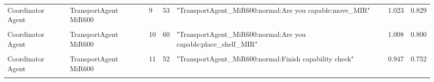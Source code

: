 \begin{table}[b]
\begin{tabular}{m{} m{} m{} m{} m{} m{} m{}}
    Coordinator Agent & TransportAgent MiR600 & 9  & 53  & "TransportAgent\_MiR600:normal:Are you capable:move\_MIR"                                                                                                                                                                                                                                                                                                                                                                                                                                                                                                                                                                                                                                & 1.023 & 0.829 \\ 
    & & & & & &\\
    Coordinator Agent & TransportAgent MiR600 & 10 & 60  & "TransportAgent\_MiR600:normal:Are you capable:place\_shelf\_MIR"                                                                                                                                                                                                                                                                                                                                                                                                                                                                                                                                                                                                                        & 1.008 & 0.800 \\ 
    & & & & & &\\
    Coordinator Agent & TransportAgent MiR600 & 11 & 52  & "TransportAgent\_MiR600:normal:Finish capability check"                                                                                                                                                                                                                                                                                                                                                                                                                                                                                                                                                                                                                                  & 0.947 & 0.752 \\ 
    & & & & & &\\

\end{tabular}
\end{table}
